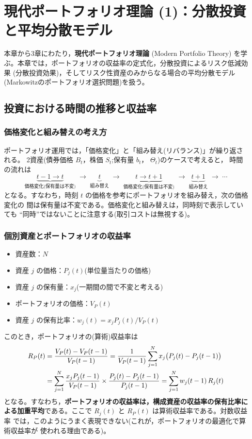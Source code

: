 \chapter{現代ポートフォリオ理論 (1)：分散投資と平均分散モデル}

本章から3章にわたり，\textbf{現代ポートフォリオ理論} (Modern Portfolio Theory)
を学ぶ。本章では，ポートフォリオの収益率の定式化，分散投資によるリスク低減効果
(分散投資効果)，そしてリスク性資産のみからなる場合の平均分散モデル
(Markowitzのポートフォリオ選択問題)を扱う。

\section{投資における時間の推移と収益率}

\subsection{価格変化と組み替えの考え方}

ポートフォリオ運用では，「価格変化」と「組み替え(リバランス)」が繰り返される。
2資産(債券価格 $B_t$，株価 $S_t$;保有量 $b_t$， $\Theta_t$)のケースで考えると，
時間の流れは
\[
\underbrace{t-1 \to t}_{\text{価格変化(保有量は不変)}}
\;\to\;
\underbrace{t}_{\text{組み替え}}
\;\to\;
\underbrace{t \to t+1}_{\text{価格変化(保有量は不変)}}
\;\to\;
\underbrace{t+1}_{\text{組み替え}}
\;\to\;\cdots
\]
となる。すなわち，時刻 $t$ の価格を参考にポートフォリオを組み替え，次の価格変化の
間は保有量は不変である。価格変化と組み替えは，同時刻で表示していても
“同時”ではないことに注意する(取引コストは無視する)。

\subsection{個別資産とポートフォリオの収益率}

\begin{itemize}
\item 資産数：$N$
\item 資産 $j$ の価格：$P_j(t)$(単位量当たりの価格)
\item 資産 $j$ の保有量：$x_j$(一期間の間で不変と考える)
\item ポートフォリオの価格：$V_P(t)$
\item 資産 $j$ の保有比率：$w_j(t) = x_j P_j(t)/V_P(t)$
\end{itemize}

このとき，ポートフォリオの(算術)収益率は
\begin{align}
R_P(t) &= \frac{V_P(t) - V_P(t-1)}{V_P(t-1)}
= \frac{1}{V_P(t-1)}\sum_{j=1}^{N} x_j\bigl(P_j(t) - P_j(t-1)\bigr)\notag\\
&= \sum_{j=1}^{N}\frac{x_j P_j(t-1)}{V_P(t-1)}\times
\frac{P_j(t)-P_j(t-1)}{P_j(t-1)}
= \sum_{j=1}^{N} w_j(t-1)\, R_j(t)
\label{eq:port-return}
\end{align}
となる。すなわち，\textbf{ポートフォリオの収益率は，構成資産の収益率の保有比率に
よる加重平均}である。ここで $R_j(t)$ と $R_P(t)$ は算術収益率である。対数収益率
では，このようにうまく表現できない(これが，ポートフォリオの最適化で算術収益率が
使われる理由である)。

